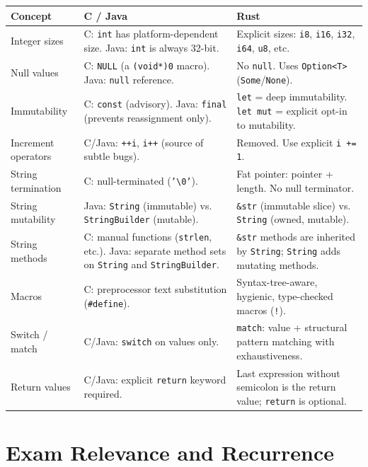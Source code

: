 \begin{center}
\begin{tabular}{|p{3.5cm}|p{5cm}|p{5cm}|}
\hline
\textbf{Concept} & \textbf{C / Java} & \textbf{Rust} \\
\hline
Integer sizes & C: \texttt{int} has platform-dependent size. Java: \texttt{int} is always 32-bit. & Explicit sizes: \texttt{i8}, \texttt{i16}, \texttt{i32}, \texttt{i64}, \texttt{u8}, etc. \\
\hline
Null values & C: \texttt{NULL} (a \texttt{(void*)0} macro). Java: \texttt{null} reference. & No \texttt{null}. Uses \texttt{Option<T>} (\texttt{Some}/\texttt{None}). \\
\hline
Immutability & C: \texttt{const} (advisory). Java: \texttt{final} (prevents reassignment only). & \texttt{let} = deep immutability. \texttt{let mut} = explicit opt-in to mutability. \\
\hline
Increment operators & C/Java: \texttt{++i}, \texttt{i++} (source of subtle bugs). & Removed. Use explicit \texttt{i += 1}. \\
\hline
String termination & C: null-terminated (\texttt{'\textbackslash 0'}). & Fat pointer: pointer + length. No null terminator. \\
\hline
String mutability & Java: \texttt{String} (immutable) vs. \texttt{StringBuilder} (mutable). & \texttt{\&str} (immutable slice) vs. \texttt{String} (owned, mutable). \\
\hline
String methods & C: manual functions (\texttt{strlen}, etc.). Java: separate method sets on \texttt{String} and \texttt{StringBuilder}. & \texttt{\&str} methods are inherited by \texttt{String}; \texttt{String} adds mutating methods. \\
\hline
Macros & C: preprocessor text substitution (\texttt{\#define}). & Syntax-tree-aware, hygienic, type-checked macros (\texttt{!}). \\
\hline
Switch / match & C/Java: \texttt{switch} on values only. & \texttt{match}: value + structural pattern matching with exhaustiveness. \\
\hline
Return values & C/Java: explicit \texttt{return} keyword required. & Last expression without semicolon is the return value; \texttt{return} is optional. \\
\hline
\end{tabular}
\end{center}

\section*{Exam Relevance and Recurrence}

